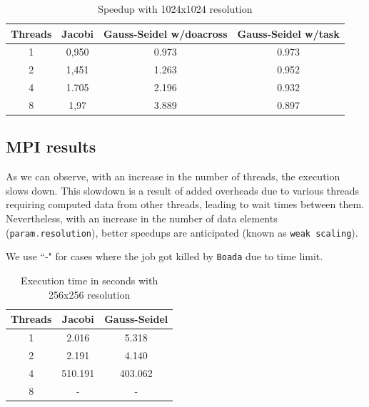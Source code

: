 \documentclass[titlepage]{article}
\newcommand{\incode}[1]{\lstinline[style=inlineC,language=C]{#1}}
\begin{document}
\begin{table}[H]
\begin{center}
    \begin{tabular}{ |c|c|c|c| } 
     \hline
     \bfseries{Threads} & \bfseries{Jacobi} &
     \bfseries{Gauss-Seidel w/doacross} &
     \bfseries{Gauss-Seidel w/task} \\
     \hline
     1 & 0,950 & 0.973 & 0.973 \\
     2 & 1,451 & 1.263 & 0.952 \\ 
     4 & 1.705 & 2.196 & 0.932 \\ 
     8 & 1,97 & 3.889 & 0.897 \\ 
     \hline
    \end{tabular}
\end{center}
\caption{Speedup with 1024x1024 resolution}
\end{table}

\subsection{MPI results}

As we can observe, with an increase in the number of threads, the execution slows down. This slowdown is a result of added overheads due to various threads requiring computed data from other threads, leading to wait times between them. Nevertheless, with an increase in the number of data elements (\incode{param.resolution}), better speedups are anticipated (known as \incode{weak scaling}).

We use ``-" for cases where the job got killed by \incode{Boada} due to time limit. 

\begin{table}[H]
\begin{center}
    \begin{tabular}{ |c|c|c| } 
     \hline
     \bfseries{Threads} & \bfseries{Jacobi} &
     \bfseries{Gauss-Seidel}\\
     \hline
     1 & 2.016  & 5.318 \\
     2 & 2.191 & 4.140 \\ 
     4 & 510.191 & 403.062 \\ 
     8 &  -  &  - \\ 
     \hline
    \end{tabular}
\end{center}
\caption{Execution time in seconds with 256x256 resolution}
\end{table}
\end{document}
